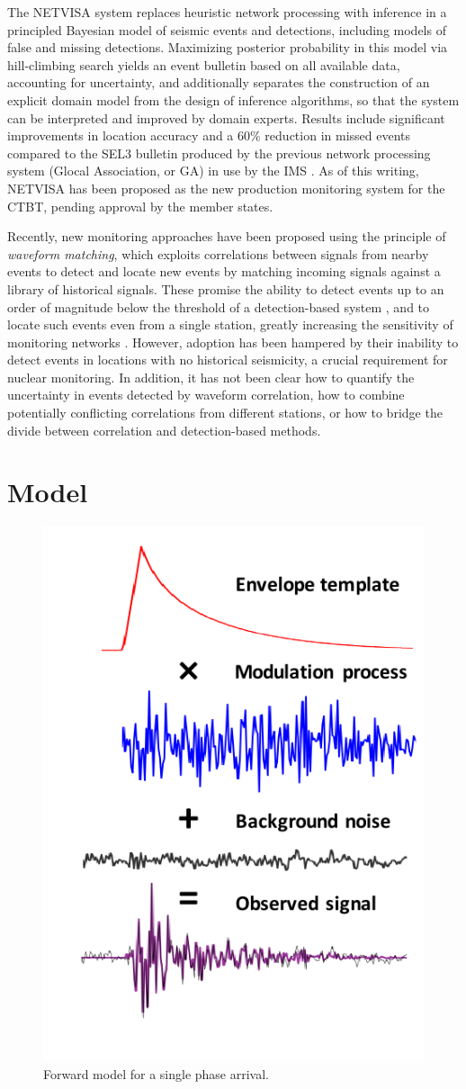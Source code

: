 \documentclass[twoside]{article} \usepackage{aistats2017}
\begin{document}
The NETVISA system \citep{arora2010global,arora2013net} replaces heuristic network
processing with inference in a principled Bayesian model of seismic
events and detections, including models of false and missing
detections. Maximizing posterior probability in this model via
hill-climbing search yields an event bulletin based on all available
data, accounting for uncertainty, and additionally separates
the construction of an explicit domain model from the design of
inference algorithms, so that the system can be interpreted and
improved by domain experts. Results include significant improvements
in location accuracy and a 60\% reduction in missed events compared to
the SEL3 bulletin produced by the previous network processing system (Glocal
Association, or GA) in use by the IMS \citep{arora2013net}. As of this
writing, NETVISA has been proposed as the new production monitoring
system for the CTBT, pending approval by the member states. 

Recently, new monitoring approaches have been proposed using the
principle of {\em waveform matching}, which exploits correlations
between signals from nearby events to detect and
locate new events by matching incoming signals against a library of
historical signals. These promise the ability
to detect events up to an order of magnitude below the threshold of a
detection-based system \citep{gibbons2006detection,schaff2010one}, and
to locate such events even from a single station, greatly increasing
the sensitivity of monitoring networks
\citep{schaff2012seismological}. However, adoption has been hampered by their inability to detect
events in locations with no historical seismicity, a crucial requirement
for nuclear monitoring. In addition, it has not been clear how to quantify
the uncertainty in events detected by waveform correlation, how to
combine potentially conflicting correlations from different stations,
or how to bridge the divide between correlation and detection-based
methods. 

\section{Model}

\begin{figure}
\centering
\includegraphics[width=.35\textwidth]{model_algebra_cropped}
\caption{Forward model for a single phase arrival.}
\label{fig:model_algebra}
\end{figure}
\end{document}
